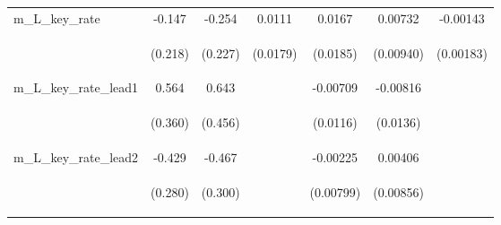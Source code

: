 \documentclass[]{article}
\begin{document}
\begin{center}
\begin{tabular}{lcccccc}
m\_L\_key\_rate & -0.147 & -0.254 & 0.0111 & 0.0167 & 0.00732 & -0.00143 \\
\vspace{4pt} & \begin{footnotesize}(0.218)\end{footnotesize} & \begin{footnotesize}(0.227)\end{footnotesize} & \begin{footnotesize}(0.0179)\end{footnotesize} & \begin{footnotesize}(0.0185)\end{footnotesize} & \begin{footnotesize}(0.00940)\end{footnotesize} & \begin{footnotesize}(0.00183)\end{footnotesize} \\
m\_L\_key\_rate\_lead1 & 0.564 & 0.643 &  & -0.00709 & -0.00816 &  \\
\vspace{4pt} & \begin{footnotesize}(0.360)\end{footnotesize} & \begin{footnotesize}(0.456)\end{footnotesize} & \begin{footnotesize}\end{footnotesize} & \begin{footnotesize}(0.0116)\end{footnotesize} & \begin{footnotesize}(0.0136)\end{footnotesize} & \begin{footnotesize}\end{footnotesize} \\
m\_L\_key\_rate\_lead2 & -0.429 & -0.467 &  & -0.00225 & 0.00406 &  \\
\vspace{4pt} & \begin{footnotesize}(0.280)\end{footnotesize} & \begin{footnotesize}(0.300)\end{footnotesize} & \begin{footnotesize}\end{footnotesize} & \begin{footnotesize}(0.00799)\end{footnotesize} & \begin{footnotesize}(0.00856)\end{footnotesize} & \begin{footnotesize}\end{footnotesize} \\

\end{tabular}
\end{center}
\end{document}
